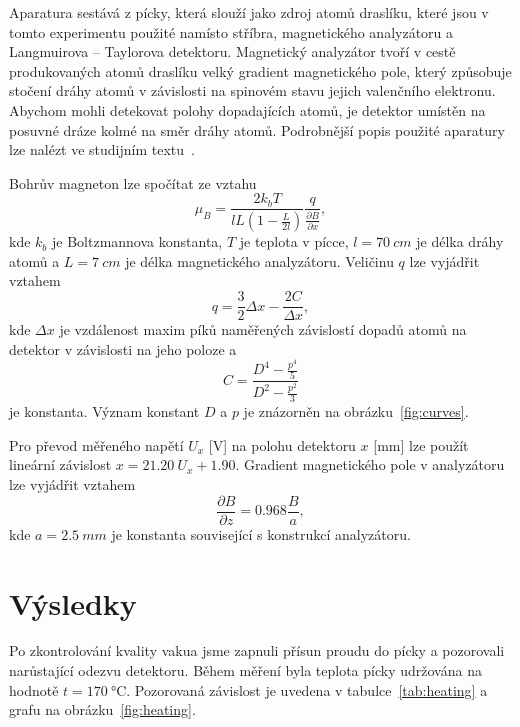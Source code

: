 \documentclass{scirep}
\begin{document}
    Aparatura sestává z pícky, která slouží jako zdroj atomů draslíku, které jsou v tomto experimentu použité namísto stříbra, magnetického analyzátoru a Langmuirova – Taylorova detektoru.
    Magnetický analyzátor tvoří v cestě produkovaných atomů draslíku velký gradient magnetického pole, který způsobuje stočení dráhy atomů v závislosti na spinovém stavu jejich valenčního elektronu.
    Abychom mohli detekovat polohy dopadajících atomů, je detektor umístěn na posuvné dráze kolmé na směr dráhy atomů.
    Podrobnější popis použité aparatury lze nalézt ve studijním textu~\cite{pokyny}.

    Bohrův magneton lze spočítat ze vztahu
    \begin{equation} \label{eq:bohr}
        \mu_B = \frac{2k_b T}{lL\left( 1 - \frac{L}{2l} \right)} \frac{q}{\frac{\partial B}{\partial x}},
    \end{equation}
    kde $k_b$ je Boltzmannova konstanta, $T$ je teplota v pícce, $l = \SI{70}{cm}$ je délka dráhy atomů a $L = \SI{7}{cm}$ je délka magnetického analyzátoru.
    Veličinu $q$ lze vyjádřit vztahem
    \[ q = \frac{3}{2} \Delta x - \frac{2C}{\Delta x}, \]
    kde $\Delta x$ je vzdálenost maxim píků naměřených závislostí dopadů atomů na detektor v závislosti na jeho poloze a
    \[ C = \frac{D^4 - \frac{p^4}{5}}{D^2 - \frac{p^2}{3}} \]
    je konstanta.
    Význam konstant $D$ a $p$ je znázorněn na obrázku~\ref{fig:curves}.

    Pro převod měřeného napětí $U_x$ [V] na polohu detektoru $x$ [mm] lze použít lineární závislost $x = \num{21,20}~U_x + \num{1,90}$.
    Gradient magnetického pole v analyzátoru lze vyjádřit vztahem
    \[ \frac{\partial B}{\partial z} = 0.968 \frac{B}{a}, \]
    kde $a = \SI{2,5}{mm}$ je konstanta související s konstrukcí analyzátoru.


    \section*{Výsledky}

    Po zkontrolování kvality vakua jsme zapnuli přísun proudu do pícky a pozorovali narůstající odezvu detektoru.
    Během měření byla teplota pícky udržována na hodnotě $t = \SI{170}{\celsius}$.
    Pozorovaná závislost je uvedena v tabulce~\ref{tab:heating} a grafu na obrázku~\ref{fig:heating}.
\end{document}
